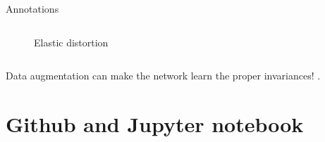 \documentclass{beamer}
\begin{document}
\begin{frame}{Annotations}
\begin{columns}[T]
\begin{column}{.16\textwidth}
\begin{figure}[!ht]
\caption{Elastic distortion}
\label{fig: Elastic distortions}
\end{figure}
\end{column}%

\end{columns}

Data augmentation can make the network learn the proper invariances! .
%

\end{frame}

\section{Github and Jupyter notebook}
\end{document}
